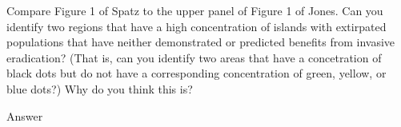 \documentclass[11pt, addpoints]{exam}
\begin{document}
\begin{questions}
\begin{solution}
\end{solution}


\question[5]
Compare Figure 1 of Spatz to the upper panel of Figure 1 of Jones. Can you identify two regions that have a high concentration of islands with extirpated populations that have neither demonstrated or predicted benefits from invasive eradication? (That is, can you identify two areas that have a concetration of black dots but do not have a corresponding concentration of green, yellow, or blue dots?) Why do you think this is?

\begin{solution}
	Answer
\end{solution}




\end{questions}
\end{document}
